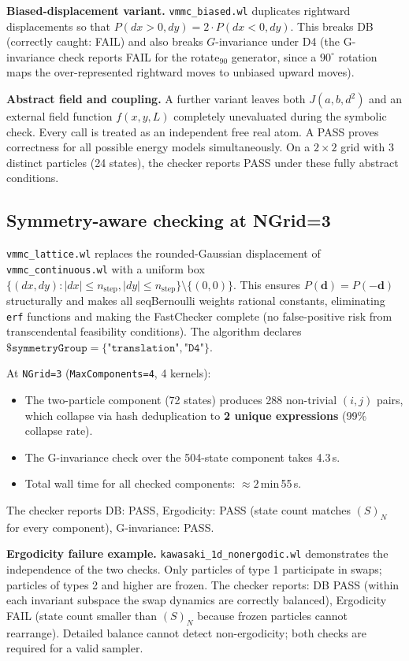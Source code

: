 \documentclass[twocolumn,10pt]{article}
\begin{document}
\smallskip\noindent\textbf{Biased-displacement variant.}
\texttt{vmmc\_biased.wl} duplicates rightward displacements so that
$P(dx>0,dy)=2\cdot P(dx<0,dy)$.  This breaks DB (correctly caught: FAIL)
and also breaks $G$-invariance under D4 (the G-invariance check reports FAIL
for the rotate$_{90}$ generator, since a $90^\circ$ rotation maps the
over-represented rightward moves to unbiased upward moves).

\smallskip\noindent\textbf{Abstract field and coupling.}
A further variant leaves both $J(a,b,d^2)$ and an external field function
$f(x,y,L)$ completely unevaluated during the symbolic check.  Every call is
treated as an independent free real atom.  A PASS proves correctness for all
possible energy models simultaneously.  On a $2\times2$ grid with 3 distinct
particles (24 states), the checker reports PASS under these fully abstract
conditions.

\subsection{Symmetry-aware checking at NGrid=3}
\label{sec:sym-example}

\texttt{vmmc\_lattice.wl} replaces the rounded-Gaussian displacement of
\texttt{vmmc\_continuous.wl} with a uniform box
$\{(dx,dy): |dx|\leq n_\mathrm{step}, |dy|\leq n_\mathrm{step}\}\setminus\{(0,0)\}$.
This ensures $P(\mathbf{d})=P(-\mathbf{d})$ structurally and makes
all seqBernoulli weights rational constants, eliminating \texttt{erf}
functions and making the FastChecker complete (no false-positive risk from
transcendental feasibility conditions).  The algorithm declares
$\texttt{\$symmetryGroup} = \{\texttt{"translation"}, \texttt{"D4"}\}$.

At \texttt{NGrid=3} (\texttt{MaxComponents=4}, 4 kernels):
\begin{itemize}
  \item The two-particle component (72 states) produces 288 non-trivial
  $(i,j)$ pairs, which collapse via hash deduplication to \textbf{2 unique
  expressions} (99\% collapse rate).
  \item The G-invariance check over the 504-state component takes 4.3\,s.
  \item Total wall time for all checked components: $\approx 2$\,min\,55\,s.
\end{itemize}
The checker reports DB: PASS, Ergodicity: PASS (state count matches
$(S)_N$ for every component), G-invariance: PASS.

\smallskip\noindent\textbf{Ergodicity failure example.}
\texttt{kawasaki\_1d\_nonergodic.wl} demonstrates the independence of the
two checks.  Only particles of type 1 participate in swaps; particles of
types 2 and higher are frozen.  The checker reports: DB PASS (within each
invariant subspace the swap dynamics are correctly balanced), Ergodicity
FAIL (state count smaller than $(S)_N$ because frozen particles cannot
rearrange).  Detailed balance cannot detect non-ergodicity; both checks are
required for a valid sampler.
\end{document}
